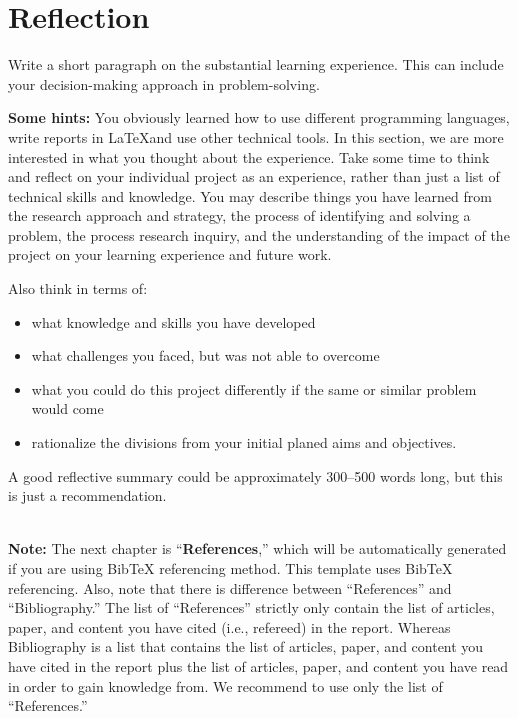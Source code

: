 \chapter{Reflection}
\label{ch:reflection}
Write a short paragraph on the substantial learning experience. This can include your decision-making approach in problem-solving.

\textbf{Some hints:} You obviously learned how to use different programming languages, write reports in \LaTeX and use other technical tools. In this section, we are more interested in what you thought about the experience. Take some time to think and reflect on your individual project as an experience, rather than just a list of technical skills and knowledge. You may describe things you have learned from the research approach and strategy, the process of identifying and solving a problem, the process research inquiry, and the understanding of the impact of the project on your learning experience and future work.

Also think in terms of:
\begin{itemize}
    \item what knowledge and skills you have developed
    \item what challenges you faced, but was not able to overcome
    \item what you could do this project differently if the same or similar problem would come
    \item rationalize the divisions from your initial planed aims and objectives.
\end{itemize}


A good reflective summary could be approximately 300--500 words long, but this is just a recommendation.

~\\[2em]
\noindent
{\huge \textbf{Note:}} The next chapter is ``\textbf{References},'' which will be automatically generated if you are using BibTeX referencing method. This template uses BibTeX referencing.  Also, note that there is difference between ``References'' and ``Bibliography.'' The list of ``References'' strictly only contain the list of articles, paper, and content you have cited (i.e., refereed) in the report. Whereas Bibliography is a list that contains the list of articles, paper, and content you have cited in the report plus the list of articles, paper, and content you have read in order to gain knowledge from. We recommend to use only the list of ``References.'' 
